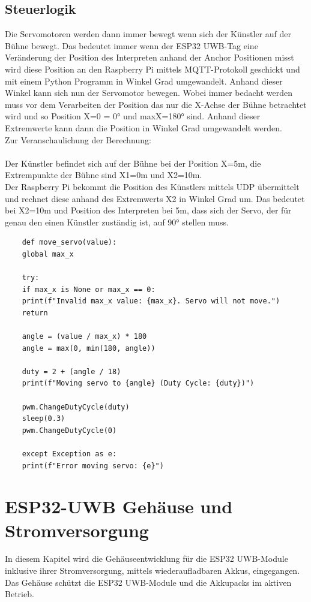 \subsection{Steuerlogik} \label{Steuerlogik}
Die Servomotoren werden dann immer bewegt wenn sich der Künstler auf der Bühne bewegt. Das bedeutet immer wenn der ESP32 UWB-Tag eine Veränderung der Position des Interpreten anhand der Anchor Positionen misst wird diese Position an den Raspberry Pi mittels MQTT-Protokoll geschickt und mit einem Python Programm in Winkel Grad umgewandelt. Anhand dieser Winkel kann sich nun der Servomotor bewegen. Wobei immer bedacht werden muss vor dem Verarbeiten der Position das nur die X-Achse der Bühne betrachtet wird und so Position X=0 = 0° und maxX=180° sind. Anhand dieser Extremwerte kann dann die Position in Winkel Grad umgewandelt werden.
\\Zur Veranschaulichung der Berechnung:\\\\
Der Künstler befindet sich auf der Bühne bei der Position X=5m, die Extrempunkte der Bühne sind X1=0m und X2=10m.\\
Der Raspberry Pi bekommt die Position des Künstlers mittels UDP übermittelt und rechnet diese anhand des Extremwerts X2 in Winkel Grad um. Das bedeutet bei X2=10m und Position des Interpreten bei 5m, dass sich der Servo, der für genau den einen Künstler zuständig ist, auf 90° stellen muss. \\

\begin{lstlisting}
	def move_servo(value):
	global max_x
	
	try:
	if max_x is None or max_x == 0:
	print(f"Invalid max_x value: {max_x}. Servo will not move.")
	return
	
	angle = (value / max_x) * 180
	angle = max(0, min(180, angle)) 
	
	duty = 2 + (angle / 18)
	print(f"Moving servo to {angle} (Duty Cycle: {duty})")
	
	pwm.ChangeDutyCycle(duty)
	sleep(0.3)
	pwm.ChangeDutyCycle(0) 
	
	except Exception as e:
	print(f"Error moving servo: {e}")
\end{lstlisting}

\section{ESP32-UWB Gehäuse und Stromversorgung}
In diesem Kapitel wird die Gehäuseentwicklung für die ESP32 UWB-Module inklusive ihrer Stromversorgung, mittels wiederaufladbaren Akkus, eingegangen. Das Gehäuse schützt die ESP32 UWB-Module und die Akkupacks im aktiven Betrieb.

